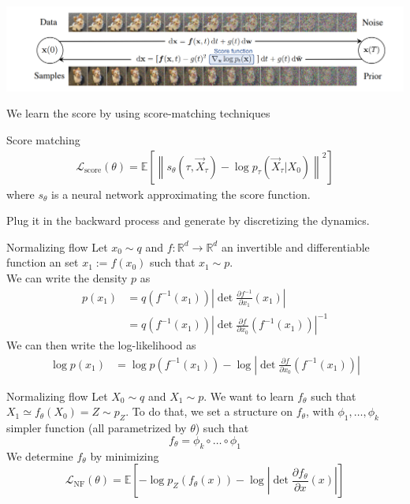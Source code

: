 \documentclass{beamer}
\begin{document}
\begin{frame}
    \includegraphics[width=1\linewidth]{score_based_dog.png}
    

    We learn the score by using score-matching techniques
    \begin{block}{Score matching}
        \begin{align}
            \mathcal{L}_\text{score}(\theta)=\mathbb{E}\left[ \left\| s_\theta \left(\tau,\overrightarrow{X}_\tau \right)-\log p_\tau \left(\overrightarrow{X}_\tau|X_0 \right)\right\|^2  \right]
        \end{align}
        where \(s_\theta\) is a neural network approximating the score function.
    \end{block}
    Plug it in the backward process and generate by discretizing the dynamics.
\end{frame}

\begin{frame}{Normalizing flow}
    Let \(x_0\sim q\) and \(f:\mathbb{R}^d\rightarrow\mathbb{R}^d\) an invertible and differentiable function an set  \(x_1:=f(x_0)\) such that \(x_1\sim p\).\\
    We can write the density \(p\) as
    \begin{align}
        p(x_1) &= q(f^{-1}(x_1))\left| \det \frac{\partial f^{-1}}{\partial x_1}(x_1)\right|\\
        &= q(f^{-1}(x_1))\left| \det \frac{\partial f}{\partial x_0}(f^{-1}(x_1))\right|^{-1} 
    \end{align}
    We can then write the log-likelihood as
    \begin{align}
        \log p(x_1) &= \log p(f^{-1}(x_1))-\log \left| \det \frac{\partial f}{\partial x_0}(f^{-1}(x_1))\right|
    \end{align}
\end{frame}

\begin{frame}{Normalizing flow}
    Let \(X_0\sim q\) and \(X_1\sim p\). We want to learn \(f_\theta\) such that \(X_1 \simeq f_\theta(X_0)=Z\sim p_Z\). To do that, we set a structure on \(f_\theta\), with \(\phi_1,\ldots,\phi_k\) simpler function (all parametrized by \(\theta\)) such that 
    \[f_\theta=\phi_k\circ\ldots\circ \phi_1\] 
    We determine \(f_\theta\) by minimizing 
    \[\mathcal{L}_\text{NF}(\theta)= \mathbb{E}\left[-\log p_Z(f_\theta(x))-\log \left|\det \frac{\partial f_\theta}{\partial x}(x)\right|\right]\]
\end{frame}
\end{document}
